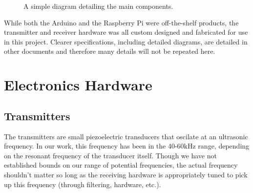 \documentclass[12pt]{article}
\begin{document}
\begin{figure}[h]
\begin{center}
\end{center}
\caption{A simple diagram detailing the main components.}
\label{fig:component-diagram}
\end{figure}

While both the Arduino and the Raspberry Pi were off-the-shelf products,
the transmitter and receiver hardware was all custom designed and fabricated
for use in this project.
Clearer specifications, including detailed diagrams, are detailed in other
documents and therefore many details will not be repeated here.

\section{Electronics Hardware}\label{sec:ee-hardware}

\subsection{Transmitters}

The transmitters are small piezoelectric transducers that oscilate at an
ultrasonic frequency.
In our work, this frequency has been in the 40-60kHz range, depending on the
resonant frequency of the transducer itself.
Though we have not established bounds on our range of potential frequencies,
the actual frequency shouldn't matter so long as the receiving hardware is
appropriately tuned to pick up this frequency (through filtering, hardware,
etc.).
\end{document}
